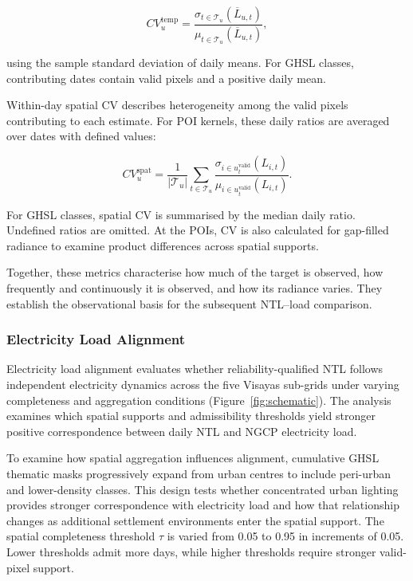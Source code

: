 \documentclass[]{interact}
\theoremstyle{plain}%
\theoremstyle{definition}
\theoremstyle{remark}
\begin{document}
        \begin{equation}
        CV^{\text{temp}}_u =
        \frac{
            \sigma_{t\in\mathcal{T}_u}\left(\overline{L}_{u,t}\right)
        }{
            \mu_{t\in\mathcal{T}_u}\left(\overline{L}_{u,t}\right)
        },
        \end{equation}
        
        using the sample standard deviation of daily means. For GHSL classes, contributing dates contain valid pixels and a positive daily mean.
        
        Within-day spatial CV describes heterogeneity among the valid pixels contributing to each estimate. For POI kernels, these daily ratios are averaged over dates with defined values:
        
        \begin{equation}
        CV^{\text{spat}}_u =
        \frac{1}{|\mathcal{T}_u|}
        \sum_{t\in\mathcal{T}_u}
        \frac{
            \sigma_{i\in u_t^{\text{valid}}}(L_{i,t})
        }{
            \mu_{i\in u_t^{\text{valid}}}(L_{i,t})
        }.
        \end{equation}
        
        For GHSL classes, spatial CV is summarised by the median daily ratio. Undefined ratios are omitted. At the POIs, CV is also calculated for gap-filled radiance to examine product differences across spatial supports.
        
        Together, these metrics characterise how much of the target is observed, how frequently and continuously it is observed, and how its radiance varies. They establish the observational basis for the subsequent NTL--load comparison.
        
    \subsubsection{Electricity Load Alignment}
        
        Electricity load alignment evaluates whether reliability-qualified NTL follows independent electricity dynamics across the five Visayas sub-grids under varying completeness and aggregation conditions (Figure~\ref{fig:schematic}). The analysis examines which spatial supports and admissibility thresholds yield stronger positive correspondence between daily NTL and NGCP electricity load.
        
        To examine how spatial aggregation influences alignment, cumulative GHSL thematic masks progressively expand from urban centres to include peri-urban and lower-density classes. This design tests whether concentrated urban lighting provides stronger correspondence with electricity load and how that relationship changes as additional settlement environments enter the spatial support. The spatial completeness threshold $\tau$ is varied from 0.05 to 0.95 in increments of 0.05. Lower thresholds admit more days, while higher thresholds require stronger valid-pixel support.
        
\end{document}
